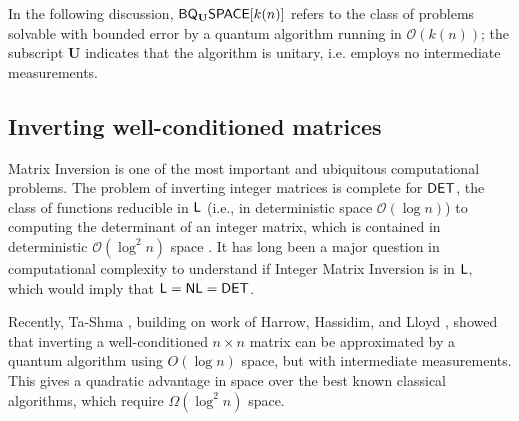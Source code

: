 \documentclass[11pt]{article}
\theoremstyle{definition}
\theoremstyle{remark}
\newcommand\DET{{\sf{DET}}}
\newcommand\Logspace{{\sf{L}}}
\newcommand{\classfont}{\sf}
\newcommand{\Unitary}{\mathbf{U}}
\newcommand{\unitaryBQSPACE}[1]{{\classfont{BQ}_\Unitary\classfont{SPACE}}[#1]}
\newcommand\bigoh{\mathcal{O}}
\begin{document}
In the following discussion, $\unitaryBQSPACE{k(n)}$ refers to the class of problems solvable with bounded error by a quantum algorithm running in $\mathcal{O}(k(n))$; the subscript $\Unitary$ indicates that the algorithm is unitary, i.e. employs no intermediate measurements.
\subsection{Inverting well-conditioned matrices}
Matrix Inversion is one of the most important and ubiquitous computational problems.  The problem of inverting integer matrices is complete for $\DET$, the class of functions reducible in $\Logspace$ (i.e., in deterministic space $\bigoh(\log{n})$) to computing the determinant of an integer matrix, which is contained in deterministic $\bigoh(\log^2{n})$ space \cite{berkowitz, cook}.  It has long been a major question in computational complexity to understand if Integer Matrix Inversion is in $\Logspace$, which would imply that $\Logspace=\sf{NL}=\DET$.

Recently, Ta-Shma \cite{tashma}, building on work of Harrow, Hassidim, and Lloyd \cite{HHL}, showed that inverting a well-conditioned $n \times n$ matrix can be approximated by a quantum algorithm using $O(\log n)$ space, but with intermediate measurements. This gives a quadratic advantage in space over the best known classical algorithms, which require $\Omega(\log^2n)$ space.
\end{document}
